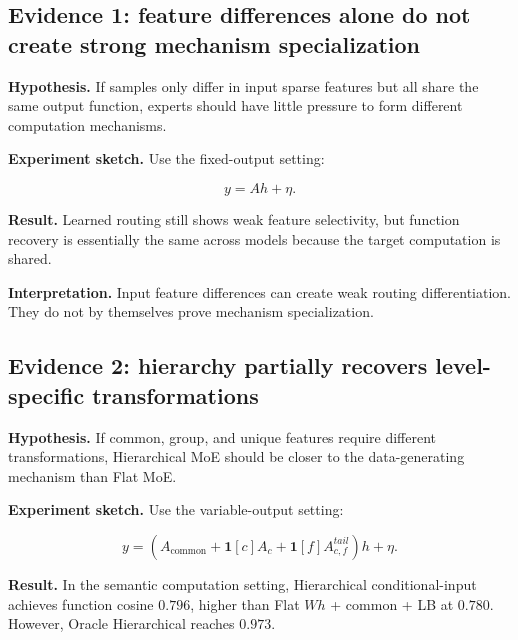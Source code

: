 \documentclass[11pt]{article}
\begin{document}
\subsection{Evidence 1: feature differences alone do not create strong mechanism specialization}

\textbf{Hypothesis.} If samples only differ in input sparse features but all share the same output function, experts should have little pressure to form different computation mechanisms.

\textbf{Experiment sketch.} Use the fixed-output setting:

$$
y=Ah+\eta.
$$

\textbf{Result.} Learned routing still shows weak feature selectivity, but function recovery is essentially the same across models because the target computation is shared.

\textbf{Interpretation.} Input feature differences can create weak routing differentiation. They do not by themselves prove mechanism specialization.

\subsection{Evidence 2: hierarchy partially recovers level-specific transformations}

\textbf{Hypothesis.} If common, group, and unique features require different transformations, Hierarchical MoE should be closer to the data-generating mechanism than Flat MoE.

\textbf{Experiment sketch.} Use the variable-output setting:

$$
y=(A_{\text{common}}+\mathbf{1}[c]A_c+\mathbf{1}[f]A_{c,f}^{tail})h+\eta.
$$

\textbf{Result.} In the semantic computation setting, Hierarchical conditional-input achieves function cosine $0.796$, higher than Flat $Wh$ + common + LB at $0.780$. However, Oracle Hierarchical reaches $0.973$.
\end{document}
